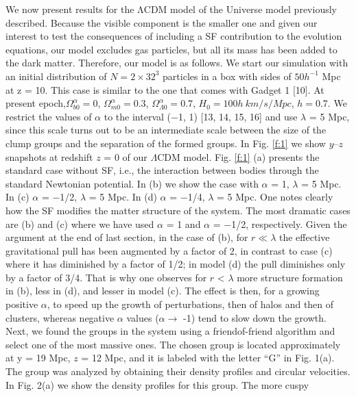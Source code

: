 \documentclass[10pt,journal]{IEEEtran}
\begin{document}
We now present results for the ΛCDM model of the
Universe model previously described. Because the visible component is the smaller one and given our interest
to test the consequences of including a SF contribution
to the evolution equations, our model excludes gas particles, but all its mass has been added to the dark matter. Therefore, our model is as follows. We start our
simulation with an initial distribution of $N = 2 × 32^3$
particles in a box with sides of $50h^{−1}$ Mpc at z = 10. \newline
This case is similar to the one that comes with Gadget 1
[10]. At present epoch,$\Omega_{b0}^{\alpha}=0$, $\Omega_{m0}^{\alpha}=0.3$, $\Omega_{\Lambda 0}^{\alpha}=0.7$, $H_0=100h \ km/s/Mpc$, $h=0.7$. We restrict the values of $\alpha$ to the interval (−1, 1) [13, 14, 15, 16] and use $\lambda$ = 5
Mpc, since this scale turns out to be an intermediate scale
between the size of the clump groups and the separation
of the formed groups. \newline
In Fig. \ref{f:1} we show $y–z$ snapshots at redshift $z$ = 0 of
our $\Lambda$CDM model. Fig. \ref{f:1} (a) presents the standard case
without SF, i.e., the interaction between bodies through
the standard Newtonian potential. In (b) we show the
case with $\alpha$ = 1, $\lambda$ = 5 Mpc. In (c) $\alpha$ = −1/2, $\lambda$ = 5
Mpc. In (d) $\alpha$ = −1/4, $\lambda$ = 5 Mpc. One notes clearly
how the SF modifies the matter structure of the system.
The most dramatic cases are (b) and (c) where we have
used $\alpha$ = 1 and $\alpha$ = −1/2, respectively. Given the argument at the end of last section, in the case of (b),
for $r \ll \lambda$ the effective gravitational pull has been augmented by a factor of 2, in contrast to case (c) where
it has diminished by a factor of 1/2; in model (d) the
pull diminishes only by a factor of 3/4. That is why one
observes for $r$ < $\lambda$ more structure formation in (b), less
in (d), and lesser in model (c). The effect is then, for a
growing positive $\alpha$, to speed up the growth of perturbations, then of halos and then of clusters, whereas negative
$\alpha$ values ($\alpha \rightarrow$ -1) tend to slow down the growth. \newline
Next, we found the groups in the system using a friendof-friend algorithm and select one of the most massive
ones. The chosen group is located approximately at y =
19 Mpc, $z$ = 12 Mpc, and it is labeled with the letter “G”
in Fig. 1(a). The group was analyzed by obtaining their
density profiles and circular velocities. In Fig. 2(a) we
show the density profiles for this group. The more cuspy
\end{document}
